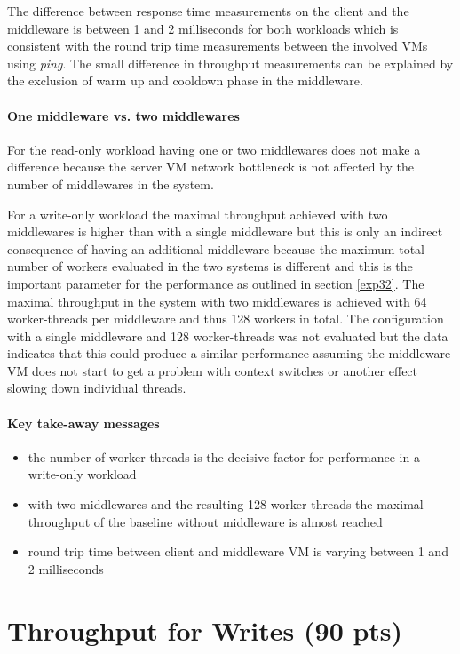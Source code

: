 \documentclass[11pt,a4paper]{article}
\begin{document}
The difference between response time measurements on the client and the middleware is between 1 and 2 milliseconds for both workloads which is consistent with the round trip time measurements between the involved VMs using \emph{ping}. The small difference in throughput measurements can be explained by the exclusion of warm up and cooldown phase in the middleware. 

\paragraph{One middleware vs. two middlewares}

For the read-only workload having one or two middlewares does not make a difference because the server VM network bottleneck is not affected by the number of middlewares in the system.

For a write-only workload the maximal throughput achieved with two middlewares is higher than with a single middleware but  this is only an indirect consequence of having an additional middleware because the maximum total number of workers evaluated in the two systems is different and this is the important parameter for the performance as outlined in section \ref{exp32}. The maximal throughput in the system with two middlewares is achieved with 64 worker-threads per middleware and thus 128 workers in total. The configuration with a single middleware and 128 worker-threads was not evaluated but the data indicates that this could produce a similar performance assuming the middleware VM does not start to get a problem with context switches or another effect slowing down individual threads.



\paragraph{Key take-away messages}
\begin{itemize}
	\item the number of worker-threads is the decisive factor for performance in a write-only workload
	\item with two middlewares and the resulting 128 worker-threads the maximal throughput of the baseline without middleware is almost reached
	\item round trip time between client and middleware VM is varying between 1 and 2 milliseconds
\end{itemize}

\section{Throughput for Writes (90 pts)}
\end{document}
